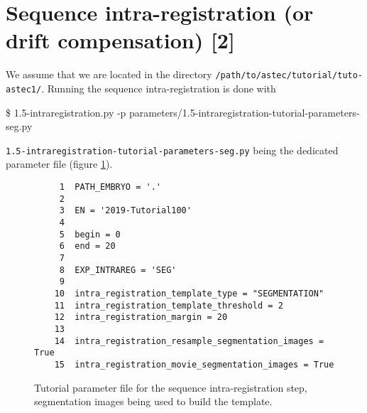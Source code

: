 \section{Sequence intra-registration (or drift compensation) [2]}
\label{sec:tutorial:intra:registration:seg}

We assume that we are located in the directory
\texttt{/path/to/astec/tutorial/tuto-astec1/}. Running the sequence intra-registration is
done with
\begin{code}{0.8}
  \$ 1.5-intraregistration.py -p parameters/1.5-intraregistration-tutorial-parameters-seg.py 
\end{code}
\texttt{1.5-intraregistration-tutorial-parameters-seg.py} being the
dedicated parameter file  (figure \ref{fig:tutorial:parameter:intra:registration:seg}).

\begin{figure}
\begin{framed}
\begin{verbatim}
     1	PATH_EMBRYO = '.'
     2	
     3	EN = '2019-Tutorial100'
     4	
     5	begin = 0
     6	end = 20
     7	
     8	EXP_INTRAREG = 'SEG'
     9	
    10	intra_registration_template_type = "SEGMENTATION"
    11	intra_registration_template_threshold = 2
    12	intra_registration_margin = 20
    13	
    14	intra_registration_resample_segmentation_images = True
    15	intra_registration_movie_segmentation_images = True
\end{verbatim}
\end{framed}
\caption{\label{fig:tutorial:parameter:intra:registration:seg} Tutorial
  parameter file for the sequence intra-registration step,
  segmentation images being used to build the template.}
\end{figure}

